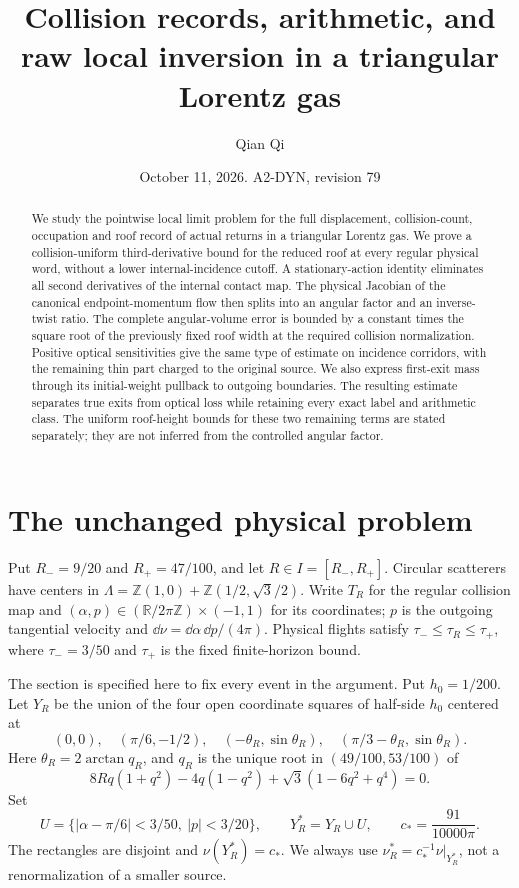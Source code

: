 \documentclass[11pt,reqno]{amsart}
\title[Collision records and raw local inversion]{Collision records, arithmetic, and raw local inversion in a triangular Lorentz gas}
\author{Qian Qi}
\date{October 11, 2026. A2-DYN, revision 79}
\numberwithin{equation}{section}
\theoremstyle{definition}
\theoremstyle{remark}\newtheorem{remark}[theorem]{Remark}
\newcommand{\R}{\mathbb R}\newcommand{\Z}{\mathbb Z}
\begin{document}
\raggedbottom
\begin{abstract}
We study the pointwise local limit problem for the full displacement,
collision-count, occupation and roof record of actual returns in a
triangular Lorentz gas. We prove a collision-uniform third-derivative
bound for the reduced roof at every regular physical word, without a
lower internal-incidence cutoff. A stationary-action identity eliminates
all second derivatives of the internal contact map. The physical
Jacobian of the canonical endpoint-momentum flow then splits into an
angular factor and an inverse-twist ratio. The complete angular-volume
error is bounded by a constant times the square root of the previously
fixed roof width at the required collision normalization. Positive
optical sensitivities give the same type of estimate on incidence
corridors, with the remaining thin part charged to the original source.
We also express first-exit mass through its initial-weight pullback to
outgoing boundaries. The resulting estimate separates true exits from
optical loss while retaining every exact label and arithmetic class.
The uniform roof-height bounds for these two remaining terms are stated
separately; they are not inferred from the controlled angular factor.
\end{abstract}
\maketitle

\section{The unchanged physical problem}
Put $R_-=9/20$ and $R_+=47/100$, and let $R\in I=[R_-,R_+]$. Circular scatterers have centers in
$\Lambda=\Z(1,0)+\Z(1/2,\sqrt3/2)$. Write $T_R$ for the regular
collision map and $(\alpha,p)\in(\R/2\pi\Z)\times(-1,1)$ for its
coordinates; $p$ is the outgoing tangential velocity and
$\dd\nu=\dd\alpha\,\dd p/(4\pi)$. Physical flights satisfy
$\tau_-\le\tau_R\le\tau_+$, where $\tau_-=3/50$ and $\tau_+$
is the fixed finite-horizon bound.

The section is specified here to fix every event in the argument.
Put $h_0=1/200$. Let $Y_R$ be the union of the four open coordinate
squares of half-side $h_0$ centered at
\[
 (0,0),\quad(\pi/6,-1/2),\quad
 (-\theta_R,\sin\theta_R),\quad
 (\pi/3-\theta_R,\sin\theta_R).
\]
Here $\theta_R=2\arctan q_R$, and $q_R$ is the unique root in
$(49/100,53/100)$ of
\[
 8Rq(1+q^2)-4q(1-q^2)+\sqrt3(1-6q^2+q^4)=0.
\]
Set
\[
 U=\{|\alpha-\pi/6|<3/50,\ |p|<3/20\},\qquad
 Y_R^*=Y_R\cup U,\qquad c_*=\frac{91}{10000\pi}.
\]
The rectangles are disjoint and $\nu(Y_R^*)=c_*$. We always use
$\nu_R^*=c_*^{-1}\nu|_{Y_R^*}$, not a renormalization of a smaller
source.
\end{document}

